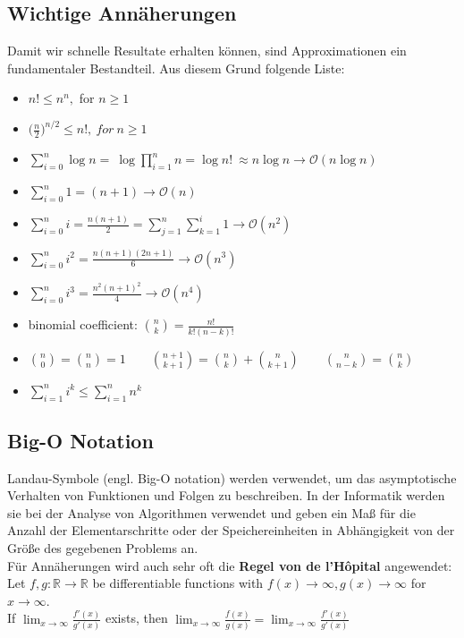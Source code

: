 \documentclass[a4paper]{article}
\begin{document}
    \subsection{Wichtige Annäherungen}
    Damit wir schnelle Resultate erhalten können, sind Approximationen ein fundamentaler Bestandteil. Aus diesem Grund folgende Liste:
    \begin{itemize}
        \item  $n! \leq n^n, $ for $  n\geq 1 $ 
        \item $\big(\frac{n}{2}\big)^{{n}/{2}} \leq n!, \ for\ n\geq 1 $
        \item $ \sum_{i=0}^{n} \log n  = \ \log\prod_{i=1}^{n}n = \log{n!} \ \approx n\log n \to\mathcal{O}(n \log n)$
        \item $\sum_{i=0}^{n} 1 = (n+1)  \to \mathcal{O}(n)$
        \item $\sum_{i=0}^{n} i = \frac{n(n+1)}{2} = \sum_{j=1}^n\sum_{k=1}^i 1 \to \mathcal{O}(n^2)$
        \item $\sum_{i=0}^{n} i^2 = \frac{n(n+1)(2n+1)}{6} \to \mathcal{O}(n^3)$
        \item $\sum_{i=0}^{n} i^3 = \frac{n^2(n+1)^2}{4}  \to\mathcal{O}(n^4)$
        \item binomial coefficient: $\binom{n}{k}= \frac{n!}{k!(n-k)!}$
        \item $\binom{n}{0}=\binom{n}{n}=1  \quad\quad
              \binom{n+1}{k+1}=\binom{n}{k}+\binom{n}{k+1}  \quad\quad
              \binom{n}{n-k}=\binom{n}{k}$
        \item $\sum_{i=1}^{n}i^k \leq \sum_{i=1}^{n}n^k$
    \end{itemize}
        

    \subsection{Big-O Notation}
    Landau-Symbole (engl. Big-O notation) werden verwendet, um das asymptotische Verhalten von Funktionen und Folgen zu beschreiben.
    In der Informatik werden sie bei der Analyse von Algorithmen verwendet und geben ein Maß für die Anzahl der Elementarschritte oder der Speichereinheiten in Abhängigkeit von der Größe des gegebenen Problems an. \\
    Für Annäherungen wird auch sehr oft die \textbf{Regel von de l'Hôpital} \label{Hôpital} angewendet:\\
        Let $f, g : \mathbb{R}\to\mathbb{R}$ be differentiable functions with $f(x)\to\infty, g(x)\to\infty$ for $x\to\infty$. \\
        If $\lim_{x\to\infty}\frac{f'(x)}{g'(x)}$ exists, then
        $\lim_{x\to\infty}\frac{f(x)}{g(x)}=\lim_{x\to\infty}\frac{f'(x)}{g'(x)}$
\end{document}
